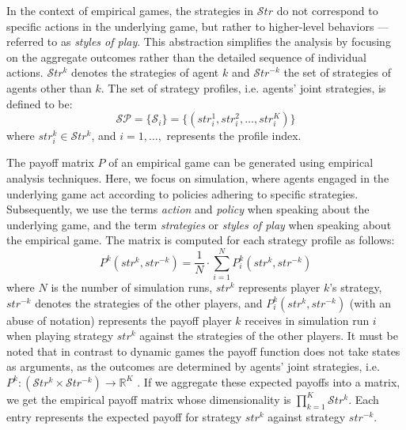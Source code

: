         \noindent
        In the context of empirical games, the strategies in $\mathcal{S}tr$ do not correspond to specific actions in the underlying game, but rather to higher-level behaviors —referred to as \emph{styles of play}. This abstraction simplifies the analysis by focusing on the aggregate outcomes rather than the detailed sequence of individual actions. $\mathcal{S}tr^k$ denotes the strategies of agent $k$ and $\mathcal{S}tr^{-k}$ the set of strategies of agents other than $k$. The set of strategy profiles, i.e. agents' joint strategies, is defined to be:
        \begin{equation}
            \mathcal{SP} = \{\mathcal{S}_i\} = \{(str_i^1, str_i^2, \dots, str_i^K)\}
            \label{eq:strategy_profiles}
        \end{equation}
        where $str_i^k \in \mathcal{S}tr^k$, and $i = 1, \dots,$ represents the profile index.\tinydouble
        
        \noindent
        The payoff matrix $P$ of an empirical game can be generated using empirical analysis techniques. Here, we focus on simulation, where agents engaged in the underlying game act according to policies adhering to specific strategies. Subsequently, we use the terms \emph{action} and \emph{policy} when speaking about the underlying game, and the term \emph{strategies} or \emph{styles of play} when speaking about the empirical game. The matrix is computed for each strategy profile as follows:
        \begin{equation}
            P^k(str^k, str^{-k}) =\frac{1}{N} \cdot \sum_{i=1}^{N} P^k_{i}(str^k, str^{-k})
            \label{eq:meta_payoff}
        \end{equation}
        where $N$ is the number of simulation runs, $str^k$ represents player $k$'s strategy, $str^{-k}$ denotes the strategies of the other players, and $P^k_{i}(str^k, str^{-k})$ (with an abuse of notation) represents the payoff player $k$ receives in simulation run $i$ when playing strategy $str^k$ against the strategies of the other players. It must be noted that in contrast to dynamic games the payoff function does not take states as arguments, as the outcomes are determined by agents' joint strategies, i.e. $P^k: (\mathcal{S}tr^k \times \mathcal{S}tr^{-k}) \to \mathbb{R}^K$ \cite{omidshafiei2019alpharank}. If we aggregate these expected payoffs into a matrix, we get the empirical payoff matrix whose dimensionality is $\prod_{k=1}^K\mathcal{S}tr^k$. Each entry represents the expected payoff for strategy $str^k$ against strategy $str^{-k}$.